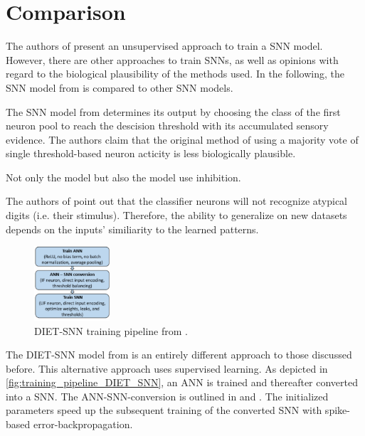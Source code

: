 \section{Comparison}
\label{sec:comparison}

The authors of \cite{SNN}  present an unsupervised approach to train a \ac{SNN} model.
However, there are other approaches to train \acp{SNN}, as well as opinions with regard to the biological plausibility of the methods used.
In the following, the \ac{SNN} model from \cite{SNN} is compared to other \ac{SNN} models.


The \ac{SNN} model from \cite{STDP_like} determines its output by 
choosing the class of the first neuron pool to reach the descision threshold with its accumulated sensory evidence.
The authors claim that the original method of using a majority vote of single threshold-based neuron acticity is less biologically plausible.

Not only the \cite{STDP_like} model but also the \cite{SNN} model use inhibition.

The authors of \cite{STDP_like} point out that the classifier neurons will not recognize atypical digits (i.e. their stimulus).
Therefore, the ability to generalize on new datasets depends on the inputs' similiarity to the learned patterns.



\begin{figure}
    \centering
    \vspace{-20pt}
    \includegraphics[width=0.25\textwidth]{pictures/DIET_SNN_pipeline.jpg}
    \caption{\acs{DIET}-\ac{SNN} training pipeline from \cite{DIET_SNN}.}
    \label{fig:training_pipeline_DIET_SNN}
\end{figure}

The \ac{DIET}-\ac{SNN} model from \cite{DIET_SNN} is an entirely different approach to those discussed before.
This alternative approach uses supervised learning.
As depicted in \autoref{fig:training_pipeline_DIET_SNN}, an \ac{ANN} is trained and thereafter converted into a \ac{SNN}.
The \ac{ANN}-\ac{SNN}-conversion is outlined in \cite{DIET_SNN} and \cite{ANN_SNN_conversion}.
The initialized parameters speed up the subsequent training of the converted \ac{SNN} with spike-based error-backpropagation.

